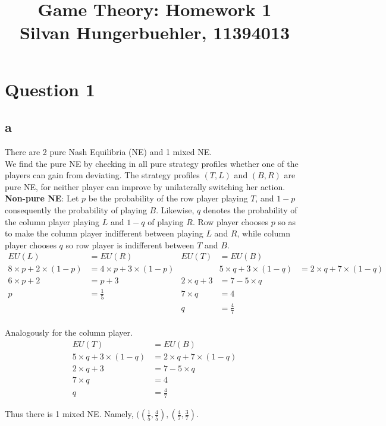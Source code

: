 \documentclass[10pt,a4paper]{article}
\title{%
  Game Theory: Homework 1 \\
  \large Silvan Hungerbuehler, 11394013}
\date{}
\begin{document}
\maketitle

\section*{Question 1}
\subsection*{a}
There are 2 pure Nash Equilibria (NE) and 1 mixed NE.\\
We find the pure NE by checking in all pure strategy profiles whether one of the players can gain from deviating. The strategy profiles $(T,L)$ and $(B,R)$ are pure NE, for neither player can improve by unilaterally switching her action.\\
\textbf{Non-pure NE}:
Let $p$ be the probability of the row player playing $T$, and $1-p$ consequently the probability of playing $B$. Likewise, $q$ denotes the probability of the column player  playing $L$ and $1-q$ of playing $R$. Row player chooses $p$ so as to make the column player indifferent between playing $L$ and $R$, while column player chooses $q$ so row player is indifferent between $T$ and $B$.\\
\begin{align*}
EU(L)&=EU(R) &EU(T)&=EU(B)\\
8\times p + 2\times (1-p)&= 4\times p + 3\times (1-p) &              &5\times q + 3\times (1-q)&= 2\times q + 7\times (1-q) \\
6\times p + 2 &= p+3 & 2\times q + 3 &= 7-5\times q \\
p &= \tfrac{1}{5} &7\times q &= 4 \\
& &q &= \tfrac{4}{7}
\end{align*}\\
Analogously for the column player.\\
\begin{align*}
EU(T)&=EU(B)\\
5\times q + 3\times (1-q)&= 2\times q + 7\times (1-q) \\
2\times q + 3 &= 7-5\times q \\
7\times q &= 4 \\
q &= \tfrac{4}{7}
\end{align*}

Thus there is 1 mixed NE. Namely, $((\tfrac{1}{5},\tfrac{4}{5}),(\tfrac{4}{7},\tfrac{3}{7})$.
\end{document}
